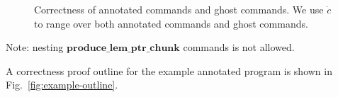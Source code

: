 \documentclass{article}
\begin{document}
\begin{figure}
\caption{Correctness of annotated commands and ghost commands. We use $\dot{c}$ to range over both annotated commands and ghost commands.}\label{fig:correctness}
\end{figure}

Note: nesting $\mathbf{produce\_lem\_ptr\_chunk}$ commands is not allowed.

A correctness proof outline for the example annotated program is shown in Fig.~\ref{fig:example-outline}.
\end{document}
